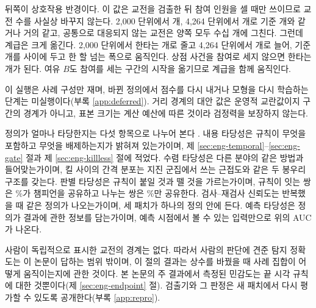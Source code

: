 뒤쪽이 상호작용 반경이다. 이 값은 교전을 검출한 뒤 참여 인원을 셀 때만 쓰이므로 교전 수를 사실상 바꾸지 않는다. 2{,}000 단위에서 \oatItwoEng{}개, 4{,}264 단위에서 \oatIfourdEng{}개로 기준 \oatRefEng{}개와 같거나 거의 같고, 공통으로 대응되지 않는 교전은 양쪽 모두 수십 개에 그친다. 그런데 계급은 크게 옮긴다. 2{,}000 단위에서 한타는 \oatItwoT{}개로 줄고 4{,}264 단위에서 \oatIfourdT{}개로 늘어, 기준 \oatRefT{}개를 사이에 두고 한 할 넘는 폭으로 움직인다. 상점 사건을 참여로 세지 않으면 한타는 \oatShopexT{}개가 된다. 여유 $B$도 참여를 세는 구간의 시작을 옮기므로 계급을 함께 움직인다.

이 실행은 사례 구성만 재며, 바뀐 정의에서 점수를 다시 내거나 모형을 다시 학습하는 단계는 미실행이다(부록 \ref{app:deferred}). 거리 경계의 대안 값은 운영적 교란값이지 구간의 경계가 아니고, 표본 크기는 계산 예산에 따른 것이라 검정력을 보장하지 않는다.



정의가 얼마나 타당한지는 다섯 항목으로 나누어 본다 \cite{jacobs2021measurement,cronbach1955construct}. 내용 타당성은 규칙이 무엇을 포함하고 무엇을 배제하는지가 밝혀져 있는가이며, 제 \ref{sec:eng-temporal}--\ref{sec:eng-gate} 절과 제 \ref{sec:eng-killless} 절에 적었다. 수렴 타당성은 다른 분야의 같은 방법과 들어맞는가이며, 킬 사이의 간격 분포는 지진 군집에서 쓰는 근접도와 같은 두 봉우리 구조를 갖는다. 판별 타당성은 규칙이 붙일 것과 뗄 것을 가르는가이며, 규칙이 잇는 쌍은 \shareLinkedPairs{}\%가 챔피언을 공유하고 나누는 쌍은 \shareSeparatedPairs{}\%만 공유한다. 검사--재검사 신뢰도는 반복했을 때 같은 정의가 나오는가이며, 세 패치가 하나의 정의 안에 든다. 예측 타당성은 정의가 결과에 관한 정보를 담는가이며, 예측 시점에서 볼 수 있는 입력만으로 위의 AUC가 나온다.

사람이 독립적으로 표시한 교전의 경계는 없다. 따라서 사람의 판단에 견준 탐지 정확도는 이 논문이 답하는 범위 밖이며, 이 절의 결과는 상수를 바꿨을 때 사례 집합이 어떻게 움직이는지에 관한 것이다. 본 논문의 주 결과에서 측정된 민감도는 끝 시각 규칙에 대한 것뿐이다(제 \ref{sec:eng-endpoint} 절). 검출기와 그 판정은 새 패치에서 다시 평가할 수 있도록 공개한다(부록 \ref{app:repro}).
